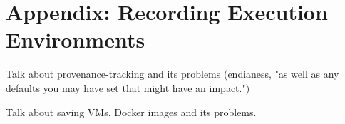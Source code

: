 \documentclass[a4paper,11pt]{article}
\begin{document}


\renewcommand*{\bibfont}{\small}
\printbibliography[title=References]

\newpage 
\appendix

\section{Appendix: Recording Execution Environments}
\label{appendix:executionenvs}
Talk about provenance-tracking and its problems (endianess, "as well as any defaults you may have set that might have an impact.")

Talk about saving VMs, Docker images and its problems.
\end{document}

